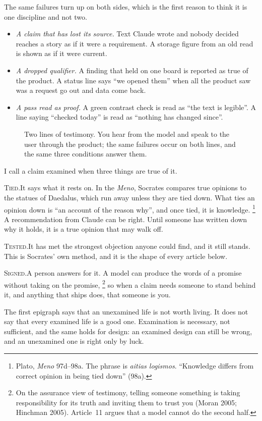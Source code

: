 \documentclass[11pt,a4paper]{article}
\newcommand{\KeepLines}[1]{\par\vskip 0pt plus #1\baselineskip\penalty-200\vskip 0pt plus -#1\baselineskip}
\newcommand{\Head}[1]{%
  \KeepLines{6}\vspace{6mm}{\large\itshape #1}\par\vspace{2mm}\noindent\ignorespaces}
\newcommand{\Sub}[1]{%
  \par\vspace{3mm}\noindent\textsc{#1}\quad}
\newcounter{art}
\newcommand{\Fig}[3]{%
  \begin{figure}[tbp]\centering #1 \caption{#2}\label{#3}\end{figure}}
\begin{document}
The same failures turn up on both sides, which is the first reason to think it is one discipline and not two.
\begin{itemize}
\item \emph{A claim that has lost its source.} Text Claude wrote and nobody decided reaches a story as if it were a requirement. A storage figure from an old read is shown as if it were current.
\item \emph{A dropped qualifier.} A finding that held on one board is reported as true of the product. A status line says ``we opened them'' when all the product saw was a request go out and data come back.
\item \emph{A pass read as proof.} A green contrast check is read as ``the text is legible''. A line saying ``checked today'' is read as ``nothing has changed since''.
\end{itemize}

\Fig{\FigTwoLines}{Two lines of testimony. You hear from the model and speak to the user through the product; the same failures occur on both lines, and the same three conditions answer them.}{fig:twolines}

\Head{What ``examined'' means}
I call a claim examined when three things are true of it.

\Sub{Tied.}It says what it rests on. In the \textit{Meno}, Socrates compares true opinions to the statues of Daedalus, which run away unless they are tied down. What ties an opinion down is ``an account of the reason why'', and once tied, it is knowledge.%
\footnote{Plato, \textit{Meno} 97d--98a. The phrase is \textit{aitias logismos}. ``Knowledge differs from correct opinion in being tied down'' (98a).}
A recommendation from Claude can be right. Until someone has written down why it holds, it is a true opinion that may walk off.

\Sub{Tested.}It has met the strongest objection anyone could find, and it still stands. This is Socrates' own method, and it is the shape of every article below.

\Sub{Signed.}A person answers for it. A model can produce the words of a promise without taking on the promise,%
\footnote{On the assurance view of testimony, telling someone something is taking responsibility for its truth and inviting them to trust you (Moran 2005; Hinchman 2005). Article~11 argues that a model cannot do the second half.}
so when a claim needs someone to stand behind it, and anything that ships does, that someone is you.

The first epigraph says that an unexamined life is not worth living. It does not say that every examined life is a good one. Examination is necessary, not sufficient, and the same holds for design: an examined design can still be wrong, and an unexamined one is right only by luck.
\end{document}
